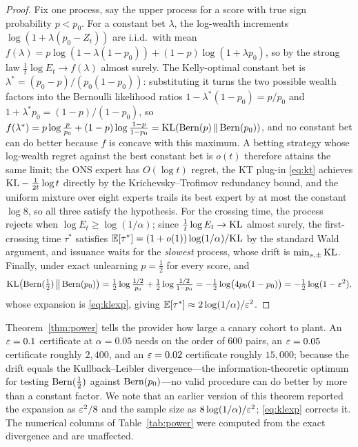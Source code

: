 \begin{proof}
Fix one process, say the upper process for a score with true sign probability
$p < p_0$. For a constant bet $\lambda$, the log-wealth increments
$\log(1 + \lambda(p_0 - Z_t))$ are i.i.d.\ with mean
$f(\lambda) = p \log(1 - \lambda(1 - p_0)) + (1-p)\log(1 + \lambda p_0)$, so by the
strong law $\tfrac1t \log E_t \to f(\lambda)$ almost surely. The Kelly-optimal
constant bet is $\lambda^\ast = (p_0 - p)/(p_0(1 - p_0))$: substituting it turns the
two possible wealth factors into the Bernoulli likelihood ratios
$1 - \lambda^\ast(1 - p_0) = p/p_0$ and $1 + \lambda^\ast p_0 = (1-p)/(1-p_0)$,
so $f(\lambda^\ast) = p \log\tfrac{p}{p_0} + (1-p)\log\tfrac{1-p}{1-p_0}
= \mathrm{KL}(\mathrm{Bern}(p)\,\|\,\mathrm{Bern}(p_0))$, and no constant bet can do better because $f$ is
concave with this maximum. A betting strategy whose log-wealth regret against the best
constant bet is $o(t)$ therefore attains the same limit; the ONS expert has $O(\log t)$
regret, the KT plug-in \eqref{eq:kt} achieves $\mathrm{KL} - \tfrac{1}{2t}\log t$ directly by
the Krichevsky--Trofimov redundancy bound, and the uniform mixture over eight experts
trails its best expert by at most the constant $\log 8$, so all three satisfy the
hypothesis. For the crossing time, the process rejects when
$\log E_t \ge \log(1/\alpha)$; since $\tfrac1t\log E_t \to \mathrm{KL}$ almost surely, the
first-crossing time $\tau^\ast$ satisfies
$\mathbb{E}[\tau^\ast] = (1 + o(1)) \log(1/\alpha)/\mathrm{KL}$ by the standard Wald argument, and
issuance waits for the \emph{slowest} process, whose drift is $\min_{s,\pm} \mathrm{KL}$.
Finally, under exact unlearning $p = \tfrac12$ for every score, and
\[
\mathrm{KL}\bigl(\mathrm{Bern}(\tfrac12)\,\big\|\,\mathrm{Bern}(p_0)\bigr)
= \tfrac12\log\tfrac{1/2}{p_0} + \tfrac12\log\tfrac{1/2}{1-p_0}
= -\tfrac12\log\bigl(4p_0(1-p_0)\bigr)
= -\tfrac12\log(1-\varepsilon^2),
\]
whose expansion is \eqref{eq:klexp}, giving
$\mathbb{E}[\tau^\ast] \approx 2\log(1/\alpha)/\varepsilon^2$.
\end{proof}

Theorem~\ref{thm:power} tells the provider how large a canary cohort to plant. An
$\varepsilon = 0.1$ certificate at $\alpha = 0.05$ needs on the order of $600$ pairs, an
$\varepsilon = 0.05$ certificate roughly $2{,}400$, and an $\varepsilon=0.02$ certificate roughly
$15{,}000$; because the drift equals the Kullback--Leibler divergence---the
information-theoretic optimum for testing $\mathrm{Bern}(\tfrac12)$ against $\mathrm{Bern}(p_0)$---no
valid procedure can do better by more than a constant factor. We note that an earlier
version of this theorem reported the expansion as $\varepsilon^2/8$ and the sample size as
$8\log(1/\alpha)/\varepsilon^2$; \eqref{eq:klexp} corrects it. The numerical columns of
Table~\ref{tab:power} were computed from the exact divergence and are unaffected.

